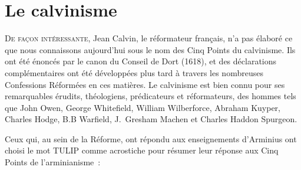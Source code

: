 \section{Le calvinisme}

\lettrine{D}{e façon intéressante,} Jean Calvin, le réformateur français, n'a pas élaboré
 ce que nous connaissons aujourd'hui sous le nom des Cinq Points du calvinisme.
 Ils ont été énoncés par le canon du Conseil de Dort (1618), et des déclarations
 complémentaires ont été développées plus tard à travers les nombreuses
 Confessions Réformées en ces matières. Le calvinisme est bien connu
 pour 
 ses remarquables érudits, théologiens, prédicateurs et réformateurs,
 des hommes tels que John Owen, George Whitefield,
 William Wilberforce, Abraham Kuyper, Charles Hodge, B.B Warfield,
 J.~Gresham Machen et Charles Haddon Spurgeon.

Ceux qui, au sein de la Réforme, ont répondu aux enseignements d'Arminius
 ont choisi le mot \og TULIP \fg{} comme acrostiche pour résumer
 leur réponse aux Cinq Points de l'arminianisme~:

